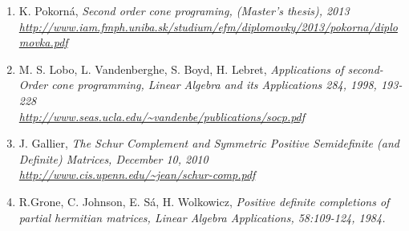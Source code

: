 \documentclass[10pt,oneside]{book}
\theoremstyle{definition}
\begin{document}
\begin{enumerate}
\label{FreundIntroSDP}
%
\item K. Pokorná, \it Second order cone programing, (Master's thesis), \rm 2013 \\
\url{http://www.iam.fmph.uniba.sk/studium/efm/diplomovky/2013/pokorna/diplomovka.pdf}
\label{PokornaSOCPDipl}
%
\item M. S. Lobo, L. Vandenberghe, S. Boyd, H. Lebret, \it Applications of second-Order cone programming, \rm Linear Algebra and its Applications 284, 1998, 193-228\\
\url{http://www.seas.ucla.edu/~vandenbe/publications/socp.pdf}
\label{LoboVandApplicationsofSOCP}
%
\item J. Gallier, \it The Schur Complement and Symmetric Positive Semidefinite (and Definite) Matrices, \rm December 10, 2010 \\
\url{http://www.cis.upenn.edu/~jean/schur-comp.pdf}
\label{GallierSchurCompl}
%
\item R.Grone, C. Johnson, E. Sá, H. Wolkowicz, \it Positive definite completions of partial hermitian matrices, \rm 
Linear Algebra Applications, 58:109-124, 1984.
\label{GronePSDcompletions}
%
\end{enumerate}
\end{document}
